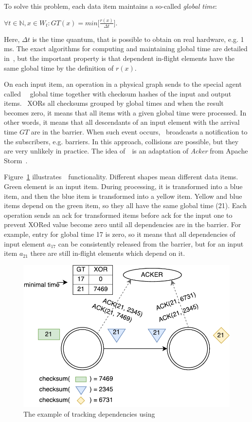 To solve this problem, each data item maintains a so-called {\em global time}: 

$\forall{t\in{\mathbb{N}}, x\in{W_t}} : GT(x)=min\Big[\frac{r(x)}{\Delta t}\Big]$. 

Here, $\Delta t$ is the time quantum, that is possible to obtain on real hardware, e.g. 1 ms. The exact algorithms for computing and maintaining global time are detailed in~\cite{we2018adbis}, but the important property is that dependent in-flight elements have the same global time by the definition of $r(x)$. 

On each input item, an operation in a physical graph sends to the special agent called~{\em \Acker\ } global time together with checksum hashes of the input and output items. \Acker\ XORs all checksums grouped by global times and when the result becomes zero, it means that all items with a given global time were processed. In other words, it means that all descendants of an input element with the arrival time $GT$ are in the barrier. When such event occurs, \Acker\ broadcasts a notification to the subscribers, e.g. barriers. In this approach, collisions are possible, but they are very unlikely in practice. The idea of~\Acker\ is an adaptation of {\em Acker} from Apache Storm~\cite{apache:storm}.

Figure~\ref{acker} illustrates~\Acker\ functionality. Different shapes mean different data items. Green element is an input item. During processing, it is transformed into a blue item, and then the blue item is transformed into a yellow item. Yellow and blue items depend on the green item, so they all have the same global time (21). Each operation sends an ack for transformed items before ack for the input one to prevent XORed value become zero until all dependencies are in the barrier. For example, entry for global time 17 is zero, so it means that all dependencies of input element $a_{17}$ can be consistently released from the barrier, but for an input item $a_{21}$ there are still in-flight elements which depend on it.

\begin{figure}[htbp]
  \centering
  \includegraphics[scale=0.58]{pics/acker}
  \caption{The example of tracking dependencies using~\Acker\ }
  \label {acker}
\end{figure}